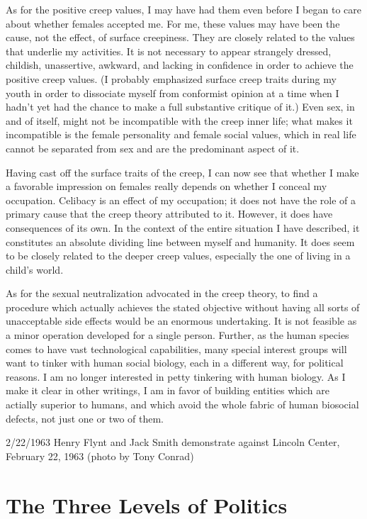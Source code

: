 \documentclass[10pt,twoside,draft]{memoir}
\begin{document}
{{{As for the positive creep values, I may have had them even before I 
began to care about whether females accepted me. For me, these values may 
have been the cause, not the effect, of surface creepiness. They are closely 
related to the values that underlie my activities. It is not necessary to appear 
strangely dressed, childish, unassertive, awkward, and lacking in confidence 
in order to achieve the positive creep values. (I probably emphasized surface 
creep traits during my youth in order to dissociate myself from conformist 
opinion at a time when I hadn't yet had the chance to make a full 
substantive critique of it.) Even sex, in and of itself, might not be 
incompatible with the creep inner life; what makes it incompatible is the 
female personality and female social values, which in real life cannot be 
separated from sex and are the predominant aspect of it. 

Having cast off the surface traits of the creep, I can now see that 
whether I make a favorable impression on females really depends on whether 
I conceal my occupation. Celibacy is an effect of my occupation; it does not 
have the role of a primary cause that the creep theory attributed to it. 
However, it does have consequences of its own. In the context of the entire 
situation I have described, it constitutes an absolute dividing line between 
myself and humanity. It does seem to be closely related to the deeper creep 
values, especially the one of living in a child's world. 

As for the sexual neutralization advocated in the creep theory, to find a 
procedure which actually achieves the stated objective without having all 
sorts of unacceptable side effects would be an enormous undertaking. It is 
not feasible as a minor operation developed for a single person. Further, as 
the human species comes to have vast technological capabilities, many 
special interest groups will want to tinker with human social biology, each in 
a different way, for political reasons. I am no longer interested in petty 
tinkering with human biology. As I make it clear in other writings, I am in 
favor of building entities which are actially superior to humans, and which 
avoid the whole fabric of human biosocial defects, not just one or two of 
them. 

\clearpage
{
	

2/22/1963 
Henry Flynt and Jack Smith demonstrate against Lincoln Center, February 22, 1963 
(photo by Tony Conrad) 
}
\clearpage


\chapter{The Three Levels of Politics}


}}}
\end{document}
